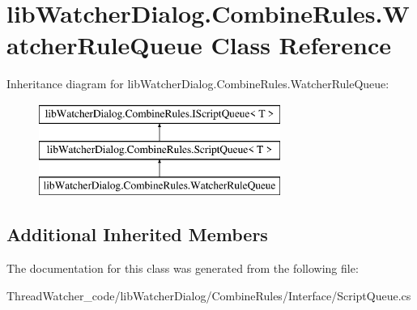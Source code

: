 \hypertarget{classlib_watcher_dialog_1_1_combine_rules_1_1_watcher_rule_queue}{\section{lib\+Watcher\+Dialog.\+Combine\+Rules.\+Watcher\+Rule\+Queue Class Reference}
\label{classlib_watcher_dialog_1_1_combine_rules_1_1_watcher_rule_queue}
}
Inheritance diagram for lib\+Watcher\+Dialog.\+Combine\+Rules.\+Watcher\+Rule\+Queue\+:\begin{figure}[H]
\begin{center}
\leavevmode
\includegraphics[height=3.000000cm]{classlib_watcher_dialog_1_1_combine_rules_1_1_watcher_rule_queue}
\end{center}
\end{figure}
\subsection*{Additional Inherited Members}


The documentation for this class was generated from the following file\+:\begin{DoxyCompactItemize}
\item 
Thread\+Watcher\+\_\+code/lib\+Watcher\+Dialog/\+Combine\+Rules/\+Interface/Script\+Queue.\+cs\end{DoxyCompactItemize}
